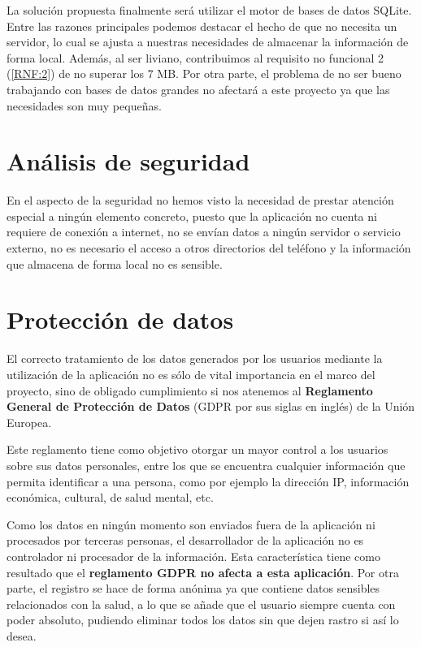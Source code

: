 La solución propuesta finalmente será utilizar el motor de bases de datos SQLite. Entre las razones principales podemos destacar el hecho de que no necesita un servidor, lo cual se ajusta a nuestras necesidades de almacenar la información de forma local. Además, al ser liviano, contribuimos al requisito no funcional 2 (\ref{RNF:2}) de no superar los 7 MB. Por otra parte, el problema de no ser bueno trabajando con bases de datos grandes no afectará a este proyecto ya que las necesidades son muy pequeñas.

\section{Análisis de seguridad}

En el aspecto de la seguridad no hemos visto la necesidad de prestar atención especial a ningún elemento concreto, puesto que la aplicación no cuenta ni requiere de conexión a internet, no se envían datos a ningún servidor o servicio externo, no es necesario el acceso a otros directorios del teléfono y la información que almacena de forma local no es sensible.

\section{Protección de datos}

El correcto tratamiento de los datos generados por los usuarios mediante la utilización de la aplicación no es sólo de vital importancia en el marco del proyecto, sino de obligado cumplimiento si nos atenemos al \textbf{Reglamento General de Protección de Datos} (GDPR por sus siglas en inglés) de la Unión Europea.

Este reglamento tiene como objetivo otorgar un mayor control a los usuarios sobre sus datos personales, entre los que se encuentra cualquier información que permita identificar a una persona, como por ejemplo la dirección IP, información económica, cultural, de salud mental, etc\cite{gdpr_eu, gdpr_powerdata}. 

Como los datos en ningún momento son enviados fuera de la aplicación ni procesados por terceras personas, el desarrollador de la aplicación no es controlador ni procesador de la información. Esta característica tiene como resultado que el \textbf{reglamento GDPR no afecta a esta aplicación}\cite{gdpr_stackexchange}. Por otra parte, el registro se hace de forma anónima ya que contiene datos sensibles relacionados con la salud, a lo que se añade que el usuario siempre cuenta con poder absoluto, pudiendo eliminar todos los datos sin que dejen rastro si así lo desea.